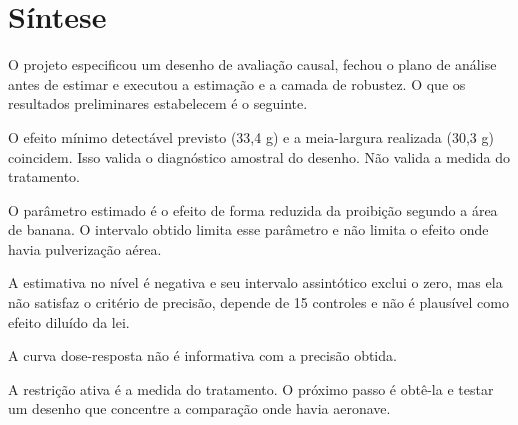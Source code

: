 \section{Síntese}
\label{sec:sintese}

O projeto especificou um desenho de avaliação causal, fechou o plano de análise
antes de estimar e executou a estimação e a camada de robustez. O que os
resultados preliminares estabelecem é o seguinte.

\begin{alineas}
  \item O efeito mínimo detectável previsto (33,4 g) e a meia-largura realizada
    (30,3 g) coincidem. Isso valida o diagnóstico amostral do desenho. Não
    valida a medida do tratamento.
  \item O parâmetro estimado é o efeito de forma reduzida da proibição segundo
    a área de banana. O intervalo obtido limita esse parâmetro e não limita o
    efeito onde havia pulverização aérea.
  \item A estimativa no nível é negativa e seu intervalo assintótico exclui o
    zero, mas ela não satisfaz o critério de precisão, depende de 15 controles
    e não é plausível como efeito diluído da lei.
  \item A curva dose-resposta não é informativa com a precisão obtida.
  \item A restrição ativa é a medida do tratamento. O próximo passo é obtê-la e
    testar um desenho que concentre a comparação onde havia aeronave.
\end{alineas}
